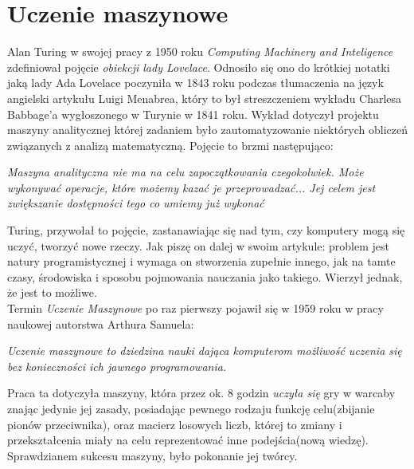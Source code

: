 \chapter{Uczenie maszynowe}

Alan Turing w swojej pracy z 1950 roku \textit{Computing Machinery and Inteligence}\cite{turing} zdefiniował pojęcie \textit{obiekcji lady Lovelace}. Odnosiło się ono do krótkiej notatki\cite{lovelace} jaką lady Ada Lovelace poczyniła w 1843 roku podczas tłumaczenia na język angielski artykułu Luigi Menabrea\cite{menabrea}, który to był streszczeniem wykładu Charlesa Babbage'a wygłoszonego w Turynie w 1841 roku. Wykład dotyczył projektu maszyny analitycznej której zadaniem było zautomatyzowanie niektórych obliczeń związanych z analizą matematyczną. Pojęcie to brzmi następująco:
\begin{center}
	\textit{Maszyna analityczna nie ma na celu zapoczątkowania czegokolwiek. Może wykonywać operacje, które możemy kazać je przeprowadzać... Jej celem jest zwiększanie dostępności tego co umiemy już wykonać}\cite{turing}
\end{center}
Turing, przywołał to pojęcie, zastanawiając się nad tym, czy komputery mogą się uczyć, tworzyć nowe rzeczy. Jak piszę on dalej w swoim artykule: problem jest natury programistycznej i wymaga on stworzenia zupełnie innego, jak na tamte czasy, środowiska i sposobu pojmowania nauczania jako takiego. Wierzył jednak, że jest to możliwe.
\\

Termin \textit{Uczenie Maszynowe} po raz pierwszy pojawił się w 1959 roku w pracy naukowej autorstwa Arthura Samuela:
\begin{center}
	\textit{Uczenie maszynowe to dziedzina nauki dająca komputerom możliwość uczenia się bez konieczności ich jawnego programowania.}\cite{samuel}
\end{center}
Praca  ta dotyczyła maszyny, która przez ok. 8 godzin \textit{uczyła się} gry w warcaby znając jedynie jej zasady, posiadając pewnego rodzaju funkcję celu(zbijanie pionów przeciwnika), oraz macierz losowych liczb, której to zmiany i przekształcenia miały na celu reprezentować inne podejścia(nową wiedzę). Sprawdzianem sukcesu maszyny, było pokonanie jej twórcy.
\\

